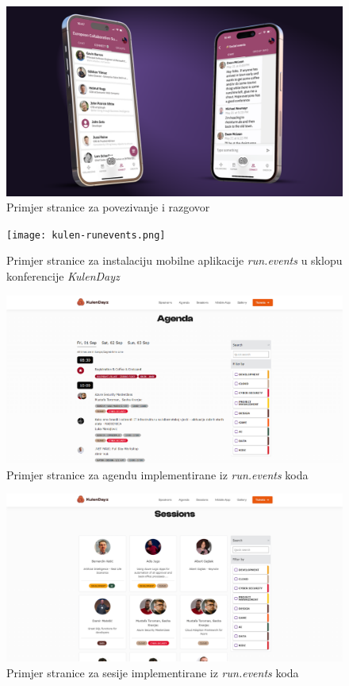 		\begin{figure}
			\centering
			\includegraphics[width=1\linewidth]{slike/runevents-connectandchat.png}
			\caption{Primjer stranice za povezivanje i razgovor}
			\label{fig:connect-chat}
		\end{figure}
		
		\begin{figure}
			\centering
			\texttt{[image: kulen-runevents.png]}
			\caption{Primjer stranice za instalaciju mobilne aplikacije \textit{run.events} u sklopu konferencije \textit{KulenDayz}}
			\label{fig:kulen-run}
		\end{figure}
		
		\begin{figure}
			\centering
			\includegraphics[width=1\linewidth]{slike/kulen-agenda.png}
			\caption{Primjer stranice za agendu implementirane iz \textit{run.events} koda}
			\label{fig:kulen-agenda}
		\end{figure}
		
		\begin{figure}
			\centering
			\includegraphics[width=1\linewidth]{slike/kulen-sessions.png}
			\caption{Primjer stranice za sesije implementirane iz \textit{run.events} koda}
			\label{fig:kulen-sessions}
		\end{figure}
		
